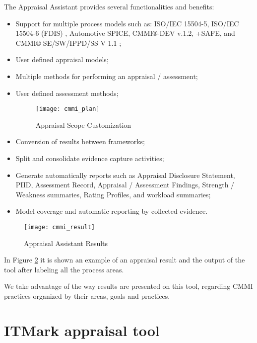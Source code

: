 The Appraisal Assistant provides several functionalities and benefits:
\begin{itemize}
	\item Support for multiple process models such as: ISO/IEC 15504-5, ISO/IEC 15504-6 (FDIS) \citep{rout2003iso}, Automotive SPICE, CMMI®-DEV v.1.2, +SAFE, and CMMI® SE/SW/IPPD/SS V 1.1 \citep{team2002capability};
	\item User defined appraisal models;
	\item Multiple methods for performing an appraisal / assessment;
	\item User defined assessment methods;
	\begin{figure}[h]
		\begin{center}
			\leavevmode
			\texttt{[image: cmmi\_plan]}
			\caption{Appraisal Scope Customization}
			\label{fig:cmmi_plan}
		\end{center}
	\end{figure}
	\item Conversion of results between frameworks;
	\item Split and consolidate evidence capture activities;
	\item Generate automatically reports such as Appraisal Disclosure Statement, PIID, Assessment Record, Appraisal / Assessment Findings, Strength / Weakness summaries, Rating Profiles, and workload summaries;
	\item Model coverage and automatic reporting by collected evidence.
\end{itemize}


\begin{figure}[h]
	\begin{center}
		\leavevmode
		\texttt{[image: cmmi\_result]}
		\caption{Appraisal Assistant Results}
		\label{fig:cmmi_result}
	\end{center}
\end{figure}

In Figure \ref{fig:cmmi_result} it is shown an example of an appraisal result and the output of the tool after labeling all the process areas.

We take advantage of the way results are presented on this tool, regarding CMMI practices organized by their areas, goals and practices.
\newpage


\section{ITMark appraisal tool}

